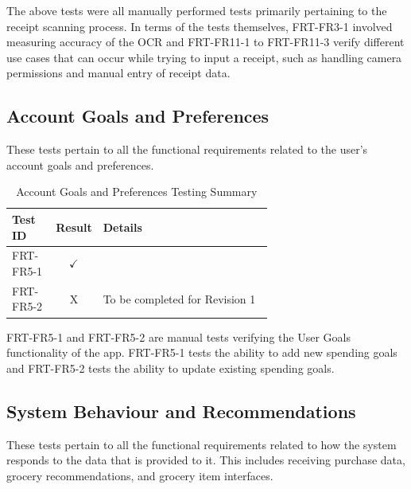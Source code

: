 \documentclass[12pt, titlepage]{article}
\begin{document}
The above tests were all manually performed tests primarily pertaining to the receipt scanning process.
In terms of the tests themselves, FRT-FR3-1 involved measuring accuracy of the OCR and FRT-FR11-1 to
FRT-FR11-3 verify different use cases that can occur while trying to input a receipt, such as handling
camera permissions and manual entry of receipt data.

\subsection{Account Goals and Preferences}

These tests pertain to all the functional requirements related to the user’s
account goals and preferences.

\begin{longtable}{|l|c|p{0.65\linewidth}|}
  \caption{Account Goals and Preferences Testing Summary} \label{Account Goals and Preferences Testing Summary} \\
  \toprule
  \textbf{Test ID} & \textbf{Result} & \textbf{Details} \\
  \midrule
  FRT-FR5-1 & $\checkmark$ & \\
  \midrule
  FRT-FR5-2 & X & To be completed for Revision 1\\
  \bottomrule
\end{longtable}

FRT-FR5-1 and FRT-FR5-2 are manual tests verifying the User Goals functionality of the app. FRT-FR5-1 tests the ability
to add new spending goals and FRT-FR5-2 tests the ability to update existing spending goals.

\subsection{System Behaviour and Recommendations}

These tests pertain to all the functional requirements related to how the
system responds to the data that is provided to it. This includes receiving purchase data, grocery recommendations, and grocery item interfaces.
\end{document}
